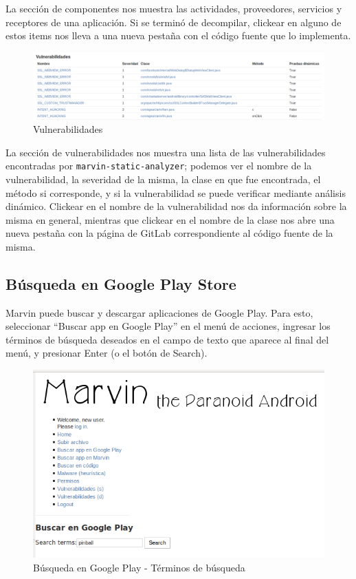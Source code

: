 \documentclass[11pt]{article}
\begin{document}
La sección de componentes nos muestra las actividades, proveedores, servicios y receptores de una aplicación. Si se terminó de decompilar, clickear en alguno de estos items nos lleva a una nueva pestaña con el código fuente que lo implementa.
\begin{figure}[H]
\begin{center}
\includegraphics[width=\textwidth]{graphics/marvin_app4.png}
\caption{Vulnerabilidades}
\end{center}
\end{figure}

La sección de vulnerabilidades nos muestra una lista de las vulnerabilidades encontradas por \texttt{marvin-static-analyzer}; podemos ver el nombre de la vulnerabilidad, la severidad de la misma, la clase en que fue encontrada, el método si corresponde, y si la vulnerabilidad se puede verificar mediante análisis dinámico. Clickear en el nombre de la vulnerabilidad nos da información sobre la misma en general, mientras que clickear en el nombre de la clase nos abre una nueva pestaña con la página de GitLab correspondiente al código fuente de la misma.

\subsection{Búsqueda en Google Play Store}
Marvin puede buscar y descargar aplicaciones de Google Play. Para esto, seleccionar ``Buscar app en Google Play'' en el menú de acciones, ingresar los términos de búsqueda deseados en el campo de texto que aparece al final del menú, y presionar Enter (o el botón de Search).
\begin{figure}[H]
\begin{center}
\includegraphics[width=\textwidth]{graphics/marvin_gplay.png}
\caption{Búsqueda en Google Play - Términos de búsqueda}
\end{center}
\end{figure}
\end{document}
